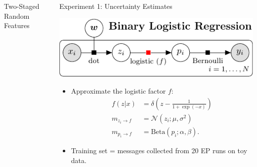 \documentclass[english]{beamer}
\newcommand{\factor}{f}				%
\newcommand{\msg}[2]{m_{#1 \rightarrow #2}}			%
\begin{document}
\begin{frame}
\begin{columns}[t]
\begin{block}{Two-Staged Random Features }
\end{block}


\begin{block}{ Experiment 1: Uncertainty Estimates}

\begin{center}
\includegraphics[width=21cm]{img/binlog_graph_title-crop}
\end{center}

\begin{itemize}

\item Approximate the logistic factor $f$: 
    \begin{align*}
    f(z|x) &= \delta\left(z-\frac{1}{1+\exp(-x)}\right)  \\
    \msg{z_i}{\factor} &= \mathcal{N}(z_i; \mu, \sigma^2) \\
    \msg{p_i}{\factor} &= \text{Beta}(p_i; \alpha, \beta). 
    \end{align*}
    \vspace{-10mm}

\item Training set = messages collected from 20 EP runs on toy data.


\end{itemize}
\end{block}
\end{columns}
\end{frame}
\end{document}
